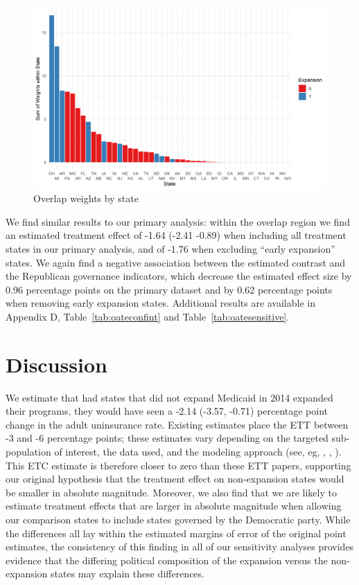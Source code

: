 \documentclass[12pt]{article}
\begin{document}
\begin{figure}[]
\begin{center}
    \includegraphics[scale=0.6]{01_Plots/oate-region-c1-a.png}
    \caption{Overlap weights by state}
    \label{oatearea}
\end{center}
\end{figure}

We find similar results to our primary analysis: within the overlap region we find an estimated treatment effect of -1.64 (-2.41 -0.89) when including all treatment states in our primary analysis, and of -1.76 when excluding ``early expansion'' states. We again find a negative association between the estimated contrast and the Republican governance indicators, which decrease the estimated effect size by 0.96 percentage points on the primary dataset and by 0.62 percentage points when removing early expansion states. Additional results are available in Appendix D, Table~\ref{tab:oateconfint} and Table~\ref{tab:oatesensitive}. 

\section{Discussion}

We estimate that had states that did not expand Medicaid in 2014 expanded their programs, they would have seen a -2.14 (-3.57, -0.71) percentage point change in the adult uninsurance rate. Existing estimates place the ETT between -3 and -6 percentage points; these estimates vary depending on the targeted sub-population of interest, the data used, and the modeling approach (see, eg, \cite{courtemanche2017early}, \cite{kaestner2017effects}, \cite{frean2017premium}). This ETC estimate is therefore closer to zero than these ETT papers, supporting our original hypothesis that the treatment effect on non-expansion states would be smaller in absolute magnitude. Moreover, we also find that we are likely to estimate treatment effects that are larger in absolute magnitude when allowing our comparison states to include states governed by the Democratic party. While the differences all lay within the estimated margins of error of the original point estimates, the consistency of this finding in all of our sensitivity analyses provides evidence that the differing political composition of the expansion versus the non-expansion states may explain these differences. 
\end{document}
